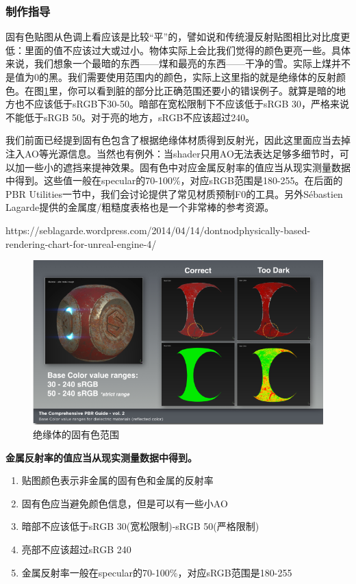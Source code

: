 \subsubsection{制作指导}

固有色贴图从色调上看应该是比较“平”的，譬如说和传统漫反射贴图相比对比度更低：里面的值不应该过大或过小。物体实际上会比我们觉得的颜色更亮一些。具体来说，我们想象一个最暗的东西——煤和最亮的东西——干净的雪。实际上煤并不是值为0的黑。我们需要使用范围内的颜色，实际上这里指的就是绝缘体的反射颜色。在图\ref{fig:chap2_8}里，你可以看到脏的部分比正确范围还要小的错误例子。就算是暗的地方也不应该低于sRGB下30-50。暗部在宽松限制下不应该低于sRGB 30，严格来说不能低于sRGB 50。对于亮的地方，sRGB不应该超过240。

我们前面已经提到固有色包含了根据绝缘体材质得到反射光，因此这里面应当去掉注入AO等光源信息。当然也有例外：当shader只用AO无法表达足够多细节时，可以加一些小的遮挡来提神效果。固有色中对应金属反射率的值应当从现实测量数据中得到。这些值一般在specular的70-100\%，对应sRGB范围是180-255。在后面的PBR Utilities一节中，我们会讨论提供了常见材质预制F0的工具。另外Sébastien Lagarde提供的金属度/粗糙度表格也是一个非常棒的参考资源。

https://seblagarde.wordpress.com/2014/04/14/dontnodphysically-based-rendering-chart-for-unreal-engine-4/

\begin{figure}[ht]
    \centering
	\includegraphics[width=\textwidth]{images/chap2_8.png}
	\caption{绝缘体的固有色范围}
    \label{fig:chap2_8}
\end{figure}

\textbf{金属反射率的值应当从现实测量数据中得到。}

\begin{enumerate}
\item 贴图颜色表示非金属的固有色和金属的反射率
\item 固有色应当避免颜色信息，但是可以有一些小AO
\item 暗部不应该低于sRGB 30(宽松限制)-sRGB 50(严格限制)
\item 亮部不应该超过sRGB 240
\item 金属反射率一般在specular的70-100\%，对应sRGB范围是180-255
\end{enumerate}

